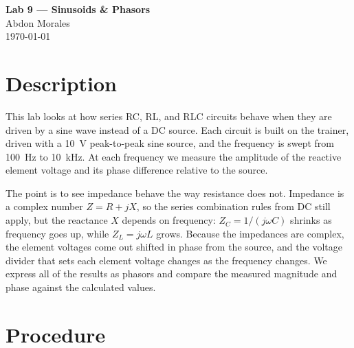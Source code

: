 \documentclass[11pt]{article}
\begin{document}
\begin{center}
    {\LARGE\bfseries Lab 9 --- Sinusoids \& Phasors}\\[0.8em]
    {\large Abdon Morales}\\[0.3em]
    {\large \today}
\end{center}
\vspace{1em}

\section*{Description}

This lab looks at how series RC, RL, and RLC circuits behave when they are driven
by a sine wave instead of a DC source. Each circuit is built on the trainer,
driven with a \SI{10}{\volt} peak-to-peak sine source, and the frequency is swept
from \SI{100}{\hertz} to \SI{10}{\kilo\hertz}. At each frequency we measure the
amplitude of the reactive element voltage and its phase difference relative to the
source.

The point is to see impedance behave the way resistance does not. Impedance is a
complex number $Z = R + jX$, so the series combination rules from DC still apply,
but the reactance $X$ depends on frequency: $Z_C = 1/(j\omega C)$ shrinks as
frequency goes up, while $Z_L = j\omega L$ grows. Because the impedances are
complex, the element voltages come out shifted in phase from the source, and the
voltage divider that sets each element voltage changes as the frequency changes.
We express all of the results as phasors and compare the measured magnitude and
phase against the calculated values.

\section*{Procedure}
\end{document}
